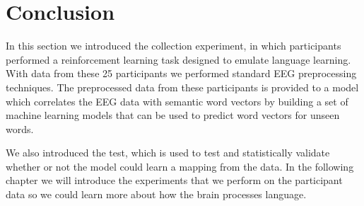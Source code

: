 \section{Conclusion}
In this section we introduced the collection experiment, in which participants 
performed a reinforcement learning task designed to emulate language learning.
With data from these 25 participants we performed standard EEG preprocessing 
techniques. The preprocessed data from these participants is provided to a model
which correlates the EEG data with semantic word vectors by building a set of 
machine learning models that can be used to predict word vectors for unseen 
words.

We also introduced the \tvt test, which is used to test and statistically 
validate whether or not the model could learn a mapping from the data. In the 
following chapter we will introduce the experiments that we perform on the 
participant data so we could learn more about how the brain processes language.
